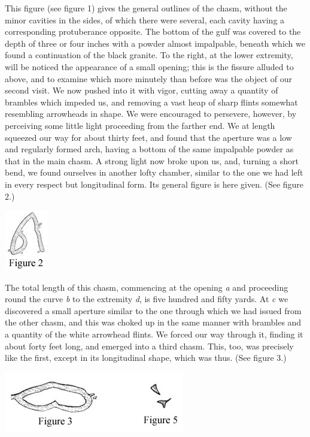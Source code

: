 This figure (see figure 1) gives the general outlines of the chasm, without
the minor cavities in the sides, of which there were several, each cavity having
a corresponding protuberance opposite. The bottom of the gulf was covered to the
depth of three or four inches with a powder almost impalpable, beneath which we
found a continuation of the black granite. To the right, at the lower extremity,
will be noticed the appearance of a small opening; this is the fissure alluded
to above, and to examine which more minutely than before was the object of our
second visit. We now pushed into it with vigor, cutting away a quantity of
brambles which impeded us, and removing a vast heap of sharp flints somewhat
resembling arrowheads in shape. We were encouraged to persevere, however, by
perceiving some little light proceeding from the farther end. We at length
squeezed our way for about thirty feet, and found that the aperture was a low
and regularly formed arch, having a bottom of the same impalpable powder as that
in the main chasm. A strong light now broke upon us, and, turning a short bend,
we found ourselves in another lofty chamber, similar to the one we had left in
every respect but longitudinal form. Its general figure is here given. (See
figure 2.) 
\begin{center}
    \includegraphics[scale=0.75]{Pym_2}
\end{center}

The total length of this chasm, commencing at the opening \emph{a} and
proceeding round the curve \emph{b} to the extremity \emph{d}, is five hundred
and fifty yards. At \emph{c} we discovered a small aperture similar to the one
through which we had issued from the other chasm, and this was choked up in the
same manner with brambles and a quantity of the white arrowhead flints. We
forced our way through it, finding it about forty feet long, and emerged into a
third chasm. This, too, was precisely like the first, except in its longitudinal
shape, which was thus. (See figure 3.) 
\begin{center}
    \includegraphics[scale=0.75]{Pym_3-5}
\end{center}


